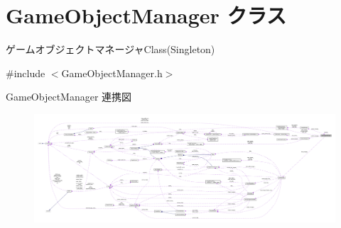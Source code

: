 \hypertarget{class_game_object_manager}{}\section{Game\+Object\+Manager クラス}
\label{class_game_object_manager}


ゲームオブジェクトマネージャ\+Class(\+Singleton)  




{\ttfamily \#include $<$Game\+Object\+Manager.\+h$>$}



Game\+Object\+Manager 連携図\nopagebreak
\begin{figure}[H]
\begin{center}
\leavevmode
\includegraphics[width=350pt]{class_game_object_manager__coll__graph}
\end{center}
\end{figure}
